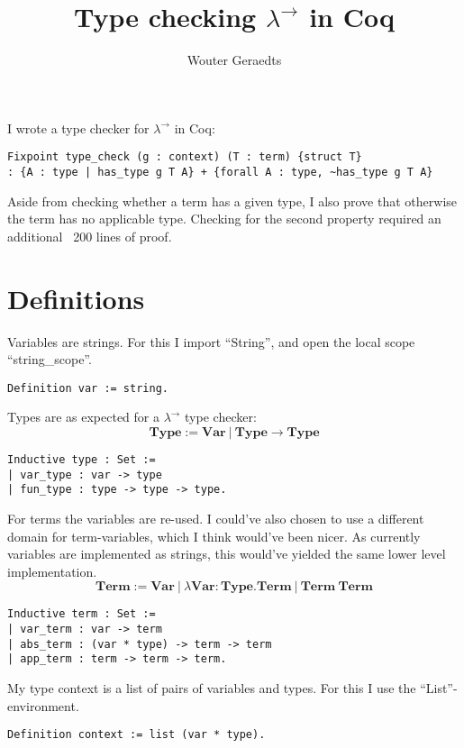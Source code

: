 \documentclass[a4paper, 10pt]{amsart}
\title{Type checking $\lambda^\rightarrow$ in Coq}
\author{Wouter Geraedts}
\begin{document}
	\maketitle

	I wrote a type checker for $\lambda^\rightarrow$ in Coq:

\begin{lstlisting}
Fixpoint type_check (g : context) (T : term) {struct T}
: {A : type | has_type g T A} + {forall A : type, ~has_type g T A}
\end{lstlisting}

	Aside from checking whether a term has a given type, I also prove that otherwise the term has no applicable type.
	Checking for the second property required an additional ~200 lines of proof.

	\section{Definitions}

	Variables are strings.
	For this I import ``String'', and open the local scope ``string\_scope''.
\begin{lstlisting}
Definition var := string.
\end{lstlisting}

	Types are as expected for a $\lambda^\rightarrow$ type checker:
	\[\mathbf{Type} := \mathbf{Var} ~|~ \mathbf{Type} \rightarrow \mathbf{Type}\]
\begin{lstlisting}
Inductive type : Set :=
| var_type : var -> type
| fun_type : type -> type -> type.
\end{lstlisting}

	For terms the variables are re-used.
	I could've also chosen to use a different domain for term-variables, which I think would've been nicer.
	As currently variables are implemented as strings, this would've yielded the same lower level implementation.
	\[\mathbf{Term} := \mathbf{Var} ~|~ \lambda \mathbf{Var} : \mathbf{Type} . \mathbf{Term} ~|~ \mathbf{Term}~\mathbf{Term}\]
\begin{lstlisting}
Inductive term : Set :=
| var_term : var -> term
| abs_term : (var * type) -> term -> term
| app_term : term -> term -> term.
\end{lstlisting}

	My type context is a list of pairs of variables and types.
	For this I use the ``List''-environment.
\begin{lstlisting}
Definition context := list (var * type).
\end{lstlisting}
\end{document}
